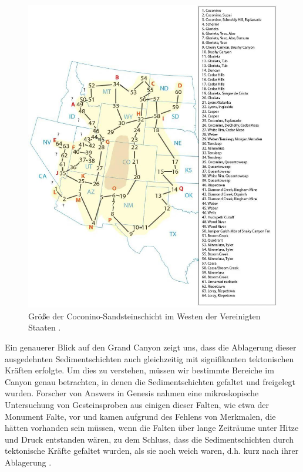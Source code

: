 \documentclass[10pt,twocolumn,letterpaper]{article}
\begin{document}
\begin{figure}[t]
\begin{center}
   \includegraphics[width=1\linewidth]{coconino.jpg}
\end{center}
   \caption{Größe der Coconino-Sandsteinschicht im Westen der Vereinigten Staaten \cite{21}.}
\label{fig:3}
\label{fig:onecol}
\end{figure}
Ein genauerer Blick auf den Grand Canyon zeigt uns, dass die Ablagerung dieser ausgedehnten Sedimentschichten auch gleichzeitig mit signifikanten tektonischen Kräften erfolgte. Um dies zu verstehen, müssen wir bestimmte Bereiche im Canyon genau betrachten, in denen die Sedimentschichten gefaltet und freigelegt wurden. Forscher von Answers in Genesis \cite{42} nahmen eine mikroskopische Untersuchung von Gesteinsproben aus einigen dieser Falten, wie etwa der Monument Falte, vor und kamen aufgrund des Fehlens von Merkmalen, die hätten vorhanden sein müssen, wenn die Falten über lange Zeiträume unter Hitze und Druck entstanden wären, zu dem Schluss, dass die Sedimentschichten durch tektonische Kräfte gefaltet wurden, als sie noch weich waren, d.h. kurz nach ihrer Ablagerung \cite{43}.
\end{document}
